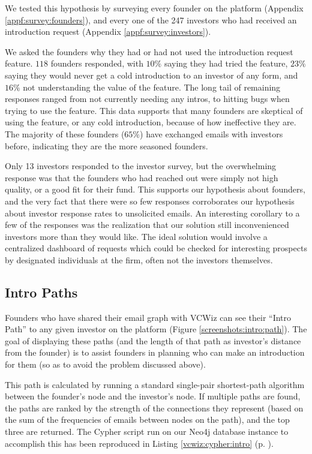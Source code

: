 We tested this hypothesis by surveying every founder on the platform (Appendix \ref{appf:survey:founders}), and every one of the 247 investors who had received an introduction request (Appendix \ref{appf:survey:investors}).

We asked the founders why they had or had not used the introduction request feature. $118$ founders responded, with $10\%$ saying they had tried the feature, $23\%$ saying they would never get a cold introduction to an investor of any form, and $16\%$ not understanding the value of the feature. The long tail of remaining responses ranged from not currently needing any intros, to hitting bugs when trying to use the feature. This data supports that many founders are skeptical of using the feature, or any cold introduction, because of how ineffective they are. The majority of these founders ($65\%$) have exchanged emails with investors before, indicating they are the more seasoned founders.

Only 13 investors responded to the investor survey, but the overwhelming response was that the founders who had reached out were simply not high quality, or a good fit for their fund. This supports our hypothesis about founders, and the very fact that there were so few responses corroborates our hypothesis about investor response rates to unsolicited emails. An interesting corollary to a few of the responses was the realization that our solution still inconvenienced investors more than they would like. The ideal solution would involve a centralized dashboard of requests which could be checked for interesting prospects by designated individuals at the firm, often not the investors themselves.

\subsection{Intro Paths}
\label{chap4:intropaths}

Founders who have shared their email graph with VCWiz can see their ``Intro Path'' to any given investor on the platform (Figure \ref{screenshots:intro:path}). The goal of displaying these paths (and the length of that path as investor's distance from the founder) is to assist founders in planning who can make an introduction for them (so as to avoid the problem discussed above).

This path is calculated by running a standard single-pair shortest-path algorithm between the founder's node and the investor's node. If multiple paths are found, the paths are ranked by the strength of the connections they represent (based on the sum of the frequencies of emails between nodes on the path), and the top three are returned. The Cypher script run on our Neo4j database instance to accomplish this has been reproduced in Listing \ref{vcwiz:cypher:intro} (p. \pageref{vcwiz:cypher:intro}).

